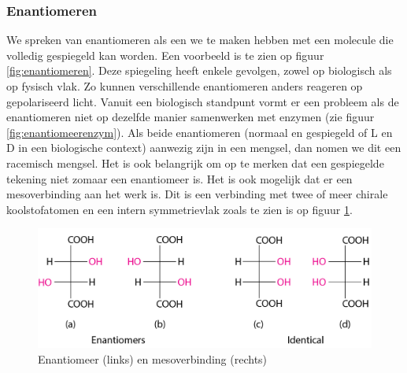 \documentclass[a4paper,kul]{kulakarticle} %
\begin{document}
\subsubsection{Enantiomeren}
\label{sec:enantiomeren}
We spreken van enantiomeren als een we te maken hebben met een molecule die volledig gespiegeld kan worden. Een voorbeeld is te zien op figuur \ref{fig:enantiomeren}. Deze spiegeling heeft enkele gevolgen, zowel op biologisch als op fysisch vlak. Zo kunnen verschillende enantiomeren anders reageren op gepolariseerd licht. Vanuit een biologisch standpunt vormt er een probleem als de enantiomeren niet op dezelfde manier samenwerken met enzymen (zie figuur \ref{fig:enantiomeerenzym}). Als beide enantiomeren (normaal en gespiegeld of L en D in een biologische context) aanwezig zijn in een mengsel, dan nomen we dit een racemisch mengsel.
Het is ook belangrijk om op te merken dat een gespiegelde tekening niet zomaar een enantiomeer is. Het is ook mogelijk dat er een mesoverbinding aan het werk is. Dit is een verbinding met twee of meer chirale koolstofatomen en een intern symmetrievlak zoals te zien is op figuur \ref{fig:mesoverbinding}. 
\begin{figure}
	\centering
	\includegraphics[width=0.7\linewidth]{mesoverbinding}
	\caption[Mesoverbinding]{Enantiomeer (links) en mesoverbinding (rechts)}
	\label{fig:mesoverbinding}
\end{figure}
\end{document}
